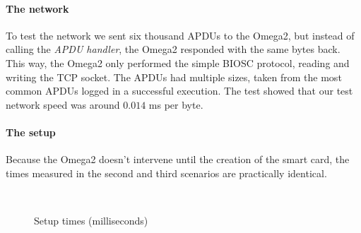 \paragraph{The network}
To test the network we sent six thousand APDUs to the Omega2, but instead of calling the \textit{APDU handler}, the Omega2 responded with the same bytes back. This way, the Omega2 only performed the simple BIOSC protocol, reading and writing the TCP socket.
The APDUs had multiple sizes, taken from the most common APDUs logged in a successful execution. The test showed that our test network speed was around $0.014$ ms per byte.


\paragraph{The setup}
Because the Omega2 doesn't intervene until the creation of the smart card, the times measured in the second and third scenarios are practically identical.

\begin{figure}[bth]
	\myfloatalign
	 \quad
	 \\
	\caption{Setup times (milliseconds)}
	\label{fig:setup:graph}
\end{figure}

